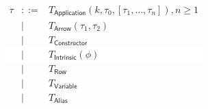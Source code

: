\documentclass[varwidth]{standalone}
\begin{document}
\setlength{\fboxsep}{10pt}
\colorbox{white}{
  $\displaystyle
  \begin{array}{rcll}
    \tau & ::= & T_{\mathsf{Application}}(k, \tau_0, [\tau_1, \dots, \tau_n]), n \ge 1 \\
         & |   & T_{\mathsf{Arrow}}(\tau_1, \tau_2) \\
         & |   & T_{\mathsf{Constructor}} \\
         & |   & T_{\mathsf{Intrinsic}}(\phi) \\
         & |   & T_{\mathsf{Row}} \\
         & |   & T_{\mathsf{Variable}} \\
         & |   & T_{\mathsf{Alias}} \\
  \end{array}
  $
}
\end{document}
